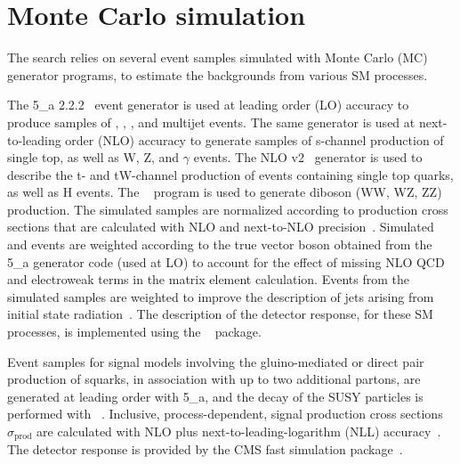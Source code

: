 
\section{Monte Carlo simulation}
\label{sec:simulation}

The search relies on several event samples simulated with Monte Carlo
(MC) generator programs, to estimate the backgrounds from various SM
processes.

The {\MADGRAPH{}5\_a\MCATNLO} 2.2.2~\cite{Alwall2014} event generator
is used at leading order (LO) accuracy to produce samples of \wj, \zj,
\ttbar, and multijet events. The same generator is used at
next-to-leading order (NLO) accuracy to generate samples of s-channel
production of single top, as well as {\ttbar}W, {\ttbar}Z, and
{\ttbar}$\gamma$ events. The NLO \POWHEG v2~\cite{powheg,
  powheg_top_Wt} generator is used to describe the t- and tW-channel
production of events containing single top quarks, as well as
{\ttbar}H events. The ~\cite{pythia} program is used to
generate diboson (WW, WZ, ZZ) production. The simulated samples are
normalized according to production cross sections that are calculated
with NLO and next-to-NLO precision~\cite{Alwall2014, wphys, fewz,
  wwxs, top++, nlotop, powheg_top_Wt}. Simulated \wj and \zj events
are weighted according to the true vector boson \pt obtained from the
{\MADGRAPH{}5\_a\MCATNLO} generator code (used at LO) to account for
the effect of missing NLO QCD and electroweak terms in the matrix
element calculation. Events from the \ttbar simulated samples are
weighted to improve the description of jets arising from initial state
radiation~\cite{}. The description of the detector response, for these
SM processes, is implemented using the \GEANTfour~\cite{geant}
package.

Event samples for signal models involving the gluino-mediated or
direct pair production of squarks, in association with up to two
additional partons, are generated at leading order with
{\MADGRAPH{}5\_a\MCATNLO}, and the decay of the SUSY particles is
performed with ~\cite{pythia}. Inclusive,
process-dependent, signal production cross sections
$\sigma_\text{prod}$ are calculated with NLO plus
next-to-leading-logarithm (NLL) accuracy~\cite{Beenakker:1996ch,
  PhysRevLett.102.111802, PhysRevD.80.095004, 1126-6708-2009-12-041,
  doi:10.1142/S0217751X11053560, susynlo}. The detector response is
provided by the CMS fast simulation package~\cite{fastsim}.

